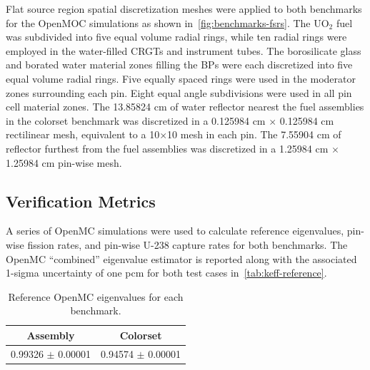 
Flat source region spatial discretization meshes were applied to both benchmarks for the OpenMOC simulations as shown in~\autoref{fig:benchmarks-fsrs}. The UO$_2$ fuel was subdivided into five equal volume radial rings, while ten radial rings were employed in the water-filled CRGTs and instrument tubes. The borosilicate glass and borated water material zones filling the BPs were each discretized into five equal volume radial rings. Five equally spaced rings were used in the moderator zones surrounding each pin. Eight equal angle subdivisions were used in all pin cell material zones. The 13.85824 cm of water reflector nearest the fuel assemblies in the colorset benchmark was discretized in a 0.125984 cm $\times$ 0.125984 cm rectilinear mesh, equivalent to a 10$\times$10 mesh in each pin. The 7.55904 cm of reflector furthest from the fuel assemblies was discretized in a 1.25984 cm $\times$ 1.25984 cm pin-wise mesh.

\subsection{Verification Metrics}
\label{subsec:metrics}

A series of OpenMC simulations were used to calculate reference eigenvalues, pin-wise fission rates, and pin-wise U-238 capture rates for both benchmarks. The OpenMC ``combined'' eigenvalue estimator is reported along with the associated 1-sigma uncertainty of one pcm for both test cases in~\autoref{tab:keff-reference}.


\begin{table}[h!]
  \centering
  \caption{Reference OpenMC eigenvalues for each benchmark.}
  \label{tab:keff-reference} 
  \begin{tabular}{c c}
  \toprule
  {\bf Assembly} &
  {\bf Colorset} \\
  \midrule
  0.99326 $\pm$ 0.00001 & 0.94574 $\pm$ 0.00001 \\
  \bottomrule
\end{tabular}
\end{table}

